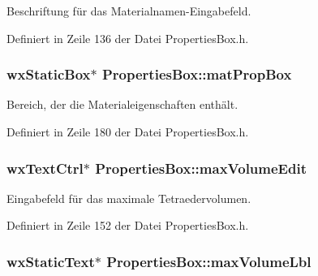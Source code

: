 Beschriftung für das Materialnamen-\/\-Eingabefeld. 



Definiert in Zeile 136 der Datei Properties\-Box.\-h.

\hypertarget{classPropertiesBox_a1ff3669bf863d80a26d2d9874b1868e1}{
\subsubsection[{mat\-Prop\-Box}]{\setlength{\rightskip}{0pt plus 5cm}wx\-Static\-Box$\ast$ Properties\-Box\-::mat\-Prop\-Box\hspace{0.3cm}{\ttfamily [private]}}}\label{classPropertiesBox_a1ff3669bf863d80a26d2d9874b1868e1}


Bereich, der die Materialeigenschaften enthält. 



Definiert in Zeile 180 der Datei Properties\-Box.\-h.

\hypertarget{classPropertiesBox_ab738d2ef986a20be47a86bb676ae11db}{
\subsubsection[{max\-Volume\-Edit}]{\setlength{\rightskip}{0pt plus 5cm}wx\-Text\-Ctrl$\ast$ Properties\-Box\-::max\-Volume\-Edit\hspace{0.3cm}{\ttfamily [private]}}}\label{classPropertiesBox_ab738d2ef986a20be47a86bb676ae11db}


Eingabefeld für das maximale Tetraedervolumen. 



Definiert in Zeile 152 der Datei Properties\-Box.\-h.

\hypertarget{classPropertiesBox_ac37df12581fc6f63aa87b2807d62fdb5}{
\subsubsection[{max\-Volume\-Lbl}]{\setlength{\rightskip}{0pt plus 5cm}wx\-Static\-Text$\ast$ Properties\-Box\-::max\-Volume\-Lbl\hspace{0.3cm}{\ttfamily [private]}}}\label{classPropertiesBox_ac37df12581fc6f63aa87b2807d62fdb5}


